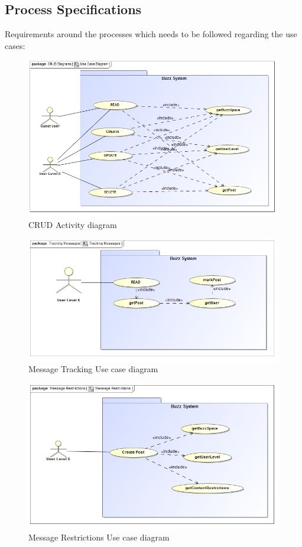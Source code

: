 \documentclass[11pt]{article}
\begin{document}
\subsection{Process Specifications}
Requirements around the processes which needs to be followed regarding the use cases: \newline
\graphicspath{ {../Diagrams/Kyhle/Activity_Diagrams/} }
	\begin{figure}[H]	
    	\includegraphics[scale=0.5]{CRUD.jpg}
    	\caption{CRUD Activity diagram}
	\end{figure}
    	
	\begin{figure}[H]	
    	\includegraphics[scale=0.5]{messageTracking.jpg}
    	\caption{Message Tracking Use case diagram}
	\end{figure}
	
	\begin{figure}[H]	
    	\includegraphics[scale=0.5]{messageRestrictions.jpg}
    	\caption{Message Restrictions Use case diagram}
	\end{figure}
\end{document}
